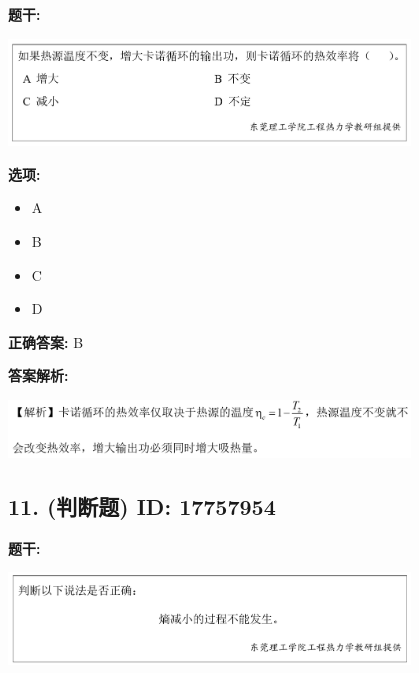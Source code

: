 \documentclass[12pt]{article}
\begin{document}
\textbf{题干:}


\begin{center}\includegraphics[width=0.8\textwidth, height=0.25\textheight, keepaspectratio]{question_10_17757943/title_img_1.png}\end{center}

\textbf{选项:}
\begin{itemize}[leftmargin=*]
  \item A

  \item B

  \item C

  \item D

\end{itemize}

\textbf{正确答案:}
B

\textbf{答案解析:}


\begin{center}\includegraphics[width=0.8\textwidth, height=0.25\textheight, keepaspectratio]{question_10_17757943/correct_replay_img_1.png}\end{center}

\vspace{0.5em}\hrulefill\vspace{1em}

\subsection*{11. (判断题) \small ID: 17757954}

\textbf{题干:}


\begin{center}\includegraphics[width=0.8\textwidth, height=0.25\textheight, keepaspectratio]{question_11_17757954/title_img_1.png}\end{center}
\end{document}
